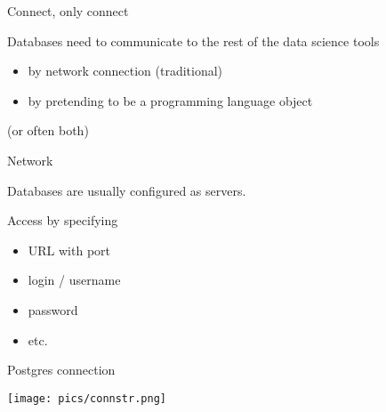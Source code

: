 \documentclass{hertieteaching}
\begin{document}
\begin{frame}{Connect, only connect}
	
Databases need to communicate to the rest of the data science tools
\begin{itemize}
  \item by network connection (traditional)
  \item by pretending to be a programming language object 
\end{itemize}
(or often both)

\end{frame}
\begin{frame}{Network}

Databases are usually configured as servers.

Access by specifying 
\begin{itemize}
  \item URL with port
  \item login / username
  \item password
  \item etc.
\end{itemize}

\end{frame}

\begin{frame}{Postgres connection}

\centerline{\texttt{[image: pics/connstr.png]}}

\end{frame}
\end{document}
